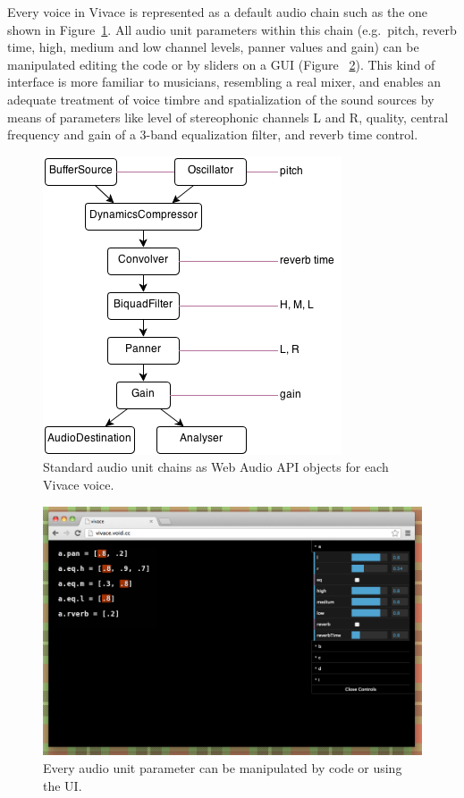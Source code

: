 \documentclass[letterpaper, 12pt]{article}
\begin{document}
{Every voice in Vivace is represented as a default audio chain such as
the one shown in Figure~\ref{fig:chain}. All audio unit parameters
within this chain (e.g.\ pitch, reverb time, high, medium and low
channel levels, panner values and gain) can be manipulated editing the
code or by sliders on a GUI (Figure ~\ref{fig:ui}). This kind of
interface is more familiar to musicians, resembling a real mixer, and
enables an adequate treatment of voice timbre and spatialization of
the sound sources by means of parameters like level of stereophonic
channels L and R, quality, central frequency and gain of a 3-band
equalization filter, and reverb time control.

\begin{figure}[htpb]
  \begin{center}
    \includegraphics[scale=.5]{img/fig_chain.png}
    \caption{Standard audio unit chains as Web Audio API objects for
      each Vivace voice.}
    \label{fig:chain}
  \end{center}
\end{figure}

\begin{figure}[htpb]
  \begin{center}
    \includegraphics[scale=.4]{img/fig_ui.png}
    \caption{Every audio unit parameter can be manipulated by code or
      using the UI.}
    \label{fig:ui}
  \end{center}
\end{figure}

}
\end{document}
